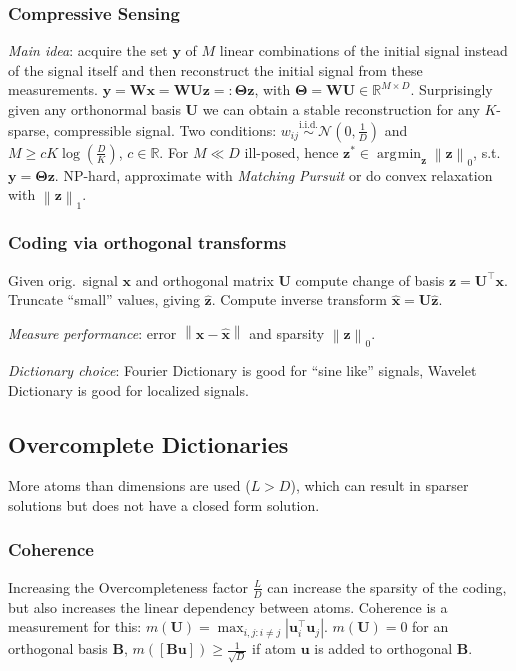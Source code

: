 \documentclass[11pt,a4paper,technote]{IEEEtran}
\DeclareMathOperator*{\argmin}{\arg\!\min}
\newcommand{\abs}[1]{\left\lvert#1\right\rvert}
\newcommand{\norm}[1]{\left\lVert#1\right\rVert}
\newcommand{\matr}[1]{\boldsymbol{\mathbf{#1}}}
\newcommand{\vect}[1]{\boldsymbol{\mathbf{#1}}}
\newcommand{\trns}[1]{#1^{\top}}
\newcommand{\normal}{\mathcal{N}}
\newcommand{\R}{\mathbb{R}}
\begin{document}
\subsubsection*{Compressive Sensing}
\emph{Main idea}: acquire the set $\vect{y}$ of $M$ linear combinations
of the initial signal instead of the signal itself and then
reconstruct the initial signal from these measurements. $\vect{y} =
\matr{W}\vect{x} = \matr{W}\matr{U}\vect{z} =: \matr{\Theta}\vect{z}$,
with $\matr{\Theta} = \matr{W}\matr{U} \in \R^{M \times D}$.
Surprisingly given any orthonormal basis $\matr{U}$ we can obtain a
stable reconstruction for any $K$-sparse, compressible signal. Two
conditions: $w_{ij} \stackrel{\text{i.i.d.}}{\sim} \normal(0,\frac{1}{D})$ and
$M \geq cK\log(\frac{D}{K})$, $c\in\R$. For $M \ll D$ ill-posed, hence
$\vect{z}^*\in \argmin_{\vect{z}} \norm{\vect{z}}_0$, s.t.\ $\vect{y} =
\matr{\Theta}\vect{\vect{z}}$. NP-hard, approximate with \emph{Matching Pursuit}
or do convex relaxation with $\norm{\vect{z}}_1$.

\subsubsection*{Coding via orthogonal transforms} Given orig.\ signal $\vect{x}$
and orthogonal matrix $\matr{U}$ compute change of basis $\vect{z} =
\trns{\matr{U}} \vect{x}$. Truncate ``small'' values, giving $\hat{\vect{z}}$.
Compute inverse transform $\hat{\vect{x}} = \matr{U}\hat{\vect{z}}$.

\emph{Measure performance}: error $\norm{\vect{x}-\hat{\vect{x}}}$ and sparsity
$\norm{\vect{z}}_0$.

\emph{Dictionary choice}: Fourier Dictionary is good for ``sine like'' signals,
Wavelet Dictionary is good for localized signals.

\vspace{-1em}
\subsection*{Overcomplete Dictionaries}
More atoms than dimensions are used ($L>D$), which can result in sparser solutions
but does not have a closed form solution.

\subsubsection*{Coherence}
Increasing the Overcompleteness factor $\frac L D$ can increase the
sparsity of the coding, but also increases the linear dependency between atoms.
Coherence is a measurement for this: $m(\matr{U}) = \max_{i,j:i\neq j}
\abs{\trns{\vect{u}_i} \vect{u}_j}$. $m(\matr{U}) = 0$ for an orthogonal basis
$\matr{B}$, $m([\matr{B}\vect{u}]) \geq \frac{1}{\sqrt{D}}$ if atom $\vect{u}$
is added to orthogonal $\matr{B}$.
\end{document}
